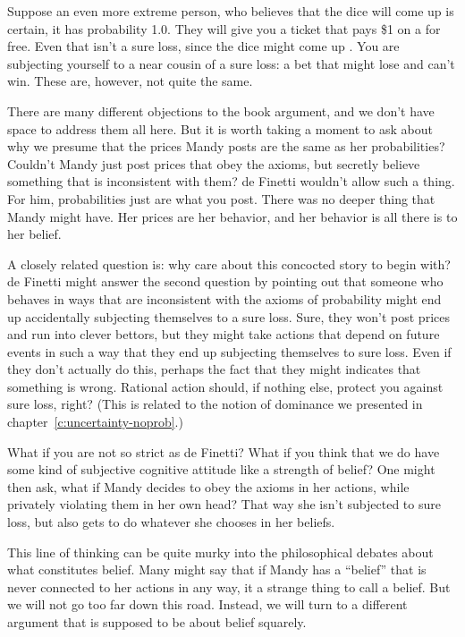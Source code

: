 Suppose an even more extreme person, who believes that the dice will come up  is certain, it has probability 1.0.  They will give you a ticket that pays \$1 on a  for free.  Even that isn't a sure loss, since the dice might come up .  You are subjecting yourself to a near cousin of a sure loss: a bet that might lose and can't win.  These are, however, not quite the same.

There are many different objections to the book argument, and we don't have space to address them all here.  But it is worth taking a moment to ask about why we presume that the prices Mandy posts are the same as her probabilities?  Couldn't Mandy just post prices that obey the axioms, but secretly believe something that is inconsistent with them? de Finetti wouldn't allow such a thing.  For him, probabilities just are what you post.  There was no deeper thing that Mandy might have. Her prices are her behavior, and her behavior is all there is to her belief.

A closely related question is: why care about this concocted story to begin with?  de Finetti might answer the second question by pointing out that someone who behaves in ways that are inconsistent with the axioms of probability might end up accidentally subjecting themselves to a sure loss.  Sure, they won't post prices and run into clever bettors, but they might take actions that depend on future events in such a way that they end up subjecting themselves to sure loss.  Even if they don't actually do this, perhaps the fact that they might indicates that something is wrong.  Rational action should, if nothing else, protect you against sure loss, right? (This is related to the notion of dominance we presented in chapter~\ref{c:uncertainty-noprob}.)

What if you are not so strict as de Finetti?  What if you think that we do have some kind of subjective cognitive attitude like a strength of belief?  One might then ask, what if Mandy decides to obey the axioms in her actions, while privately violating them in her own head?  That way she isn't subjected to sure loss, but also gets to do whatever she chooses in her beliefs.

This line of thinking can be quite murky into the philosophical debates about what constitutes belief.  Many might say that if Mandy has a ``belief'' that is never connected to her actions in any way, it a strange thing to call a belief.  But we will not go too far down this road.  Instead, we will turn to a different argument that is supposed to be about belief squarely.

